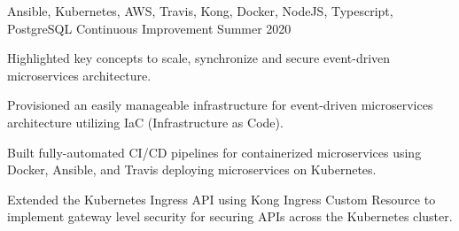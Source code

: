 \begin{cventries}
  \cventry
    {Ansible, Kubernetes, AWS, Travis, Kong, Docker, NodeJS, Typescript, PostgreSQL} %
    {Continuous Improvement} %
    {} %
    {Summer 2020} %
    {
      \begin{cvitems} %
        \item {Highlighted key concepts to scale, synchronize and secure event-driven microservices architecture.}
        \item {Provisioned an easily manageable infrastructure for event-driven microservices architecture utilizing IaC (Infrastructure as Code).}
        \item {Built fully-automated CI/CD pipelines for containerized microservices using Docker, Ansible, and Travis deploying microservices on Kubernetes.}
        \item {Extended the Kubernetes Ingress API using Kong Ingress Custom Resource to implement gateway level security for securing APIs across the Kubernetes cluster.}
      \end{cvitems}
    }



\end{cventries}
